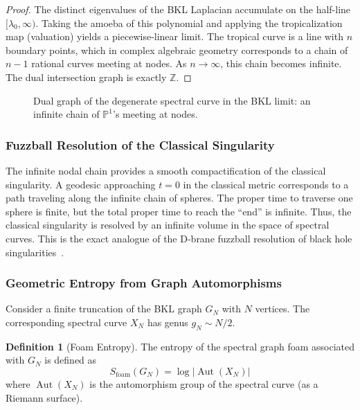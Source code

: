 \documentclass[12pt]{article}
\theoremstyle{definition}
\newtheorem{definition}[theorem]{Definition}
\DeclareMathOperator{\Aut}{Aut}
\begin{document}
\begin{proof}
The distinct eigenvalues of the BKL Laplacian accumulate on the half-line $[\lambda_0, \infty)$. Taking the amoeba of this polynomial and applying the tropicalization map (valuation) yields a piecewise-linear limit. The tropical curve is a line with $n$ boundary points, which in complex algebraic geometry corresponds to a chain of $n-1$ rational curves meeting at nodes. As $n \to \infty$, this chain becomes infinite. The dual intersection graph is exactly $\mathbb Z$.
\end{proof}

\begin{figure}[H]
\centering
{}
\caption{Dual graph of the degenerate spectral curve in the BKL limit: an infinite chain of $\mathbb{P}^1$'s meeting at nodes.}
\label{fig:nodal_chain}
\end{figure}

\subsubsection{Fuzzball Resolution of the Classical Singularity}
The infinite nodal chain provides a smooth compactification of the classical singularity. A geodesic approaching $t=0$ in the classical metric corresponds to a path traveling along the infinite chain of spheres. The proper time to traverse one sphere is finite, but the total proper time to reach the ``end'' is infinite. Thus, the classical singularity is resolved by an infinite volume in the space of spectral curves. This is the exact analogue of the D-brane fuzzball resolution of black hole singularities~\cite{Mathur2005, Lunin2002}.

\subsubsection{Geometric Entropy from Graph Automorphisms}
Consider a finite truncation of the BKL graph $G_N$ with $N$ vertices. The corresponding spectral curve $X_N$ has genus $g_N \sim N/2$.

\begin{definition}[Foam Entropy]
The entropy of the spectral graph foam associated with $G_N$ is defined as
\[
S_{\text{foam}}(G_N) = \log |\Aut(X_N)|
\]
where $\Aut(X_N)$ is the automorphism group of the spectral curve (as a Riemann surface).
\end{definition}
\end{document}
